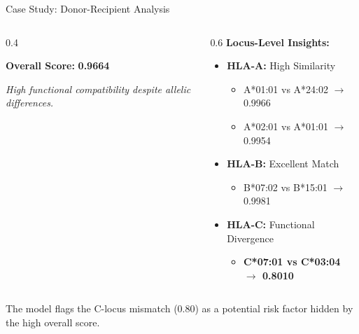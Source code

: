 \documentclass[aspectratio=169]{beamer}
\newcommand{\keytakeaway}[1]{\vspace{0.3cm}\begin{tcolorbox}[colback=yellow!10,colframe=yellow!50!black,title=Key Takeaway]\small #1\end{tcolorbox}}
\begin{document}
\begin{frame}{Case Study: Donor-Recipient Analysis}
  \begin{columns}
    \begin{column}{0.4\textwidth}
      \begin{tcolorbox}[colback=blue!5,colframe=blue!40,title=Match Report]
      \textbf{Overall Score:} \Large \textbf{0.9664}
      \end{tcolorbox}
      \vspace{0.2cm}
      \scriptsize \textit{High functional compatibility despite allelic differences.}
    \end{column}
    \begin{column}{0.6\textwidth}
      \textbf{Locus-Level Insights:}
      \begin{itemize}\small
        \item \textbf{HLA-A:} \textcolor{green!60!black}{High Similarity}
          \begin{itemize}\scriptsize
            \item A*01:01 vs A*24:02 $\rightarrow$ 0.9966
            \item A*02:01 vs A*01:01 $\rightarrow$ 0.9954
          \end{itemize}
        \item \textbf{HLA-B:} \textcolor{green!60!black}{Excellent Match}
          \begin{itemize}\scriptsize
            \item B*07:02 vs B*15:01 $\rightarrow$ 0.9981
          \end{itemize}
        \item \textbf{HLA-C:} \textcolor{red!80!black}{Functional Divergence}
          \begin{itemize}\scriptsize
            \item \textbf{C*07:01 vs C*03:04 $\rightarrow$ 0.8010}
          \end{itemize}
      \end{itemize}
    \end{column}
  \end{columns}
  
  \keytakeaway{The model flags the C-locus mismatch (0.80) as a potential risk factor hidden by the high overall score.}
\end{frame}
\end{document}
